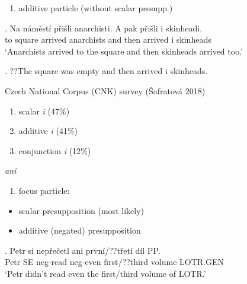 \documentclass[ignorenonframetext,]{beamer}
\providecommand{\tightlist}{%
  \setlength{\itemsep}{0pt}\setlength{\parskip}{0pt}}
\begin{document}
\begin{frame}

\begin{enumerate}
\def\labelenumi{\arabic{enumi})}
\setcounter{enumi}{2}
\tightlist
\item
  additive particle (without scalar presupp.)
\end{enumerate}

\exg. Na náměstí přišli anarchisti. A pak přišli i skinheadi.\\
to square arrived anarchists and then arrived i skinheads\\
`Anarchists arrived to the square and then skinheads arrived too.'

\ex. ??The square was empty and then arrived i skinheads.

\end{frame}

\begin{frame}

Czech National Corpus (CNK) survey (Šafratová 2018)

\begin{enumerate}
\def\labelenumi{\arabic{enumi})}
\item
  scalar \emph{i} (47\%)
\item
  additive \emph{i} (41\%)
\item
  conjunction \emph{i} (12\%)
\end{enumerate}

\end{frame}

\begin{frame}{\emph{ani}}

\begin{enumerate}
\def\labelenumi{\arabic{enumi})}
\tightlist
\item
  focus particle:
\end{enumerate}

\begin{itemize}
\tightlist
\item
  scalar presupposition (most likely)
\item
  additive (negated) presupposition
\end{itemize}

\exg. Petr si nepřečetl ani první/??třetí díl PP.\\
Petr SE neg-read neg-even first/??third volume LOTR.GEN\\
`Petr didn't read even the first/third volume of LOTR.'

\end{frame}
\end{document}

